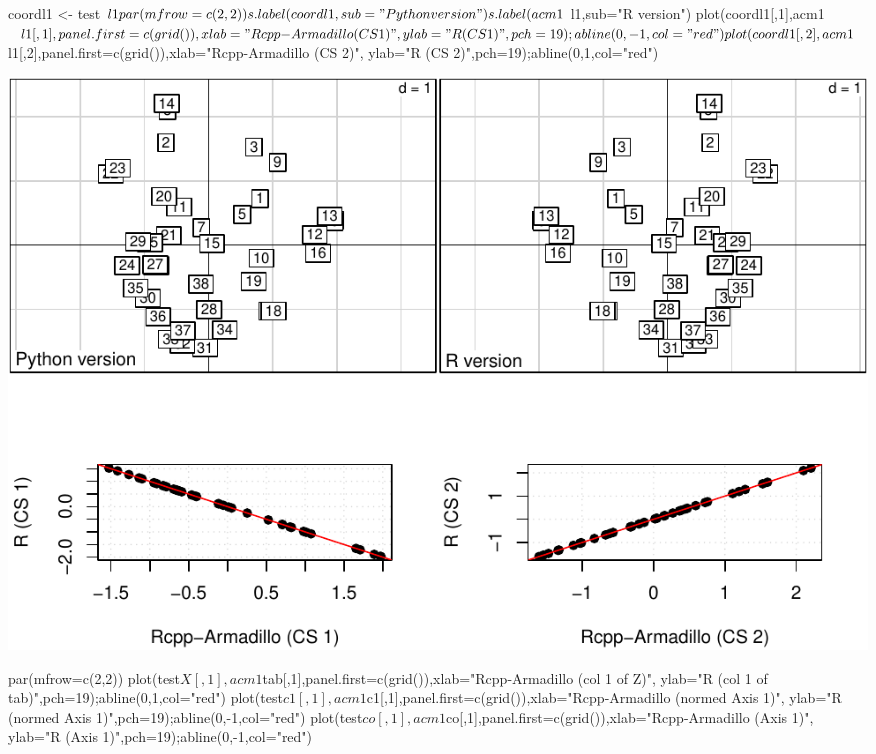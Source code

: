 \documentclass[
  10pt,
]{article}
\newenvironment{Shaded}{\begin{snugshade}}{\end{snugshade}}
\newcommand{\NormalTok}[1]{#1}
\begin{document}
\begin{Shaded}
\begin{Highlighting}[]
\NormalTok{coordl1 \textless{}{-} test$l1}
\NormalTok{par(mfrow=c(2,2))}
\NormalTok{s.label(coordl1,sub="Python version")}
\NormalTok{s.label(acm1$l1,sub="R version")}
\NormalTok{plot(coordl1[,1],acm1$l1[,1],panel.first=c(grid()),xlab="Rcpp{-}Armadillo (CS 1)",}
\NormalTok{     ylab="R (CS 1)",pch=19);abline(0,{-}1,col="red")}
\NormalTok{plot(coordl1[,2],acm1$l1[,2],panel.first=c(grid()),xlab="Rcpp{-}Armadillo (CS 2)",}
\NormalTok{     ylab="R (CS 2)",pch=19);abline(0,1,col="red")}
\end{Highlighting}
\end{Shaded}

\includegraphics{RandPytonAnalysisPDF_files/figure-latex/unnamed-chunk-64-1.pdf}

\begin{Shaded}
\begin{Highlighting}[]
\NormalTok{par(mfrow=c(2,2))}
\NormalTok{plot(test$X[,1],acm1$tab[,1],panel.first=c(grid()),xlab="Rcpp{-}Armadillo (col 1 of Z)",}
\NormalTok{     ylab="R (col 1 of tab)",pch=19);abline(0,1,col="red")}
\NormalTok{plot(test$c1[,1],acm1$c1[,1],panel.first=c(grid()),xlab="Rcpp{-}Armadillo (normed Axis 1)",}
\NormalTok{     ylab="R (normed Axis 1)",pch=19);abline(0,{-}1,col="red")}
\NormalTok{plot(test$co[,1],acm1$co[,1],panel.first=c(grid()),xlab="Rcpp{-}Armadillo (Axis 1)",}
\NormalTok{     ylab="R (Axis 1)",pch=19);abline(0,{-}1,col="red")}
\end{Highlighting}
\end{Shaded}
\end{document}
